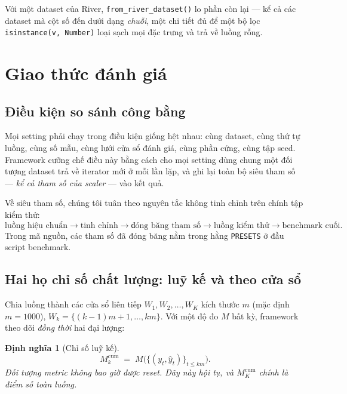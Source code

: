 \documentclass[11pt,a4paper]{article}
\newtheorem{definition}{Định nghĩa}
\theoremstyle{remark}
\begin{document}
\noindent
Với một dataset của River, \texttt{from\_river\_dataset()} lo phần còn lại --- kể
cả các dataset mà cột số đến dưới dạng \emph{chuỗi}, một chi tiết đủ để một bộ
lọc \texttt{isinstance(v, Number)} loại sạch mọi đặc trưng và trả về luồng rỗng.

\section{Giao thức đánh giá}
\label{sec:protocol}

\subsection{Điều kiện so sánh công bằng}

Mọi setting phải chạy trong điều kiện giống hệt nhau: cùng dataset, cùng thứ tự
luồng, cùng số mẫu, cùng lưới cửa sổ đánh giá, cùng phần cứng, cùng tập seed.
Framework cưỡng chế điều này bằng cách cho mọi setting dùng chung một đối tượng
dataset trả về iterator mới ở mỗi lần lặp, và ghi lại toàn bộ siêu tham số ---
\emph{kể cả tham số của scaler} --- vào kết quả.

Về siêu tham số, chúng tôi tuân theo nguyên tắc không tinh chỉnh trên chính tập
kiểm thử:
\[
\text{luồng hiệu chuẩn} \longrightarrow \text{tinh chỉnh} \longrightarrow
\text{đóng băng tham số} \longrightarrow \text{luồng kiểm thử} \longrightarrow
\text{benchmark cuối}.
\]
Trong mã nguồn, các tham số đã đóng băng nằm trong hằng \texttt{PRESETS} ở đầu
script benchmark.

\subsection{Hai họ chỉ số chất lượng: luỹ kế và theo cửa sổ}
\label{sec:cumwin}

Chia luồng thành các cửa sổ liên tiếp $W_1, W_2, \dots, W_K$ kích thước $m$
(mặc định $m=1000$), $W_k = \{(k-1)m+1,\dots,km\}$. Với một độ đo $M$ bất kỳ,
framework theo dõi \emph{đồng thời} hai đại lượng:

\begin{definition}[Chỉ số luỹ kế]
\begin{equation}
  M^{\mathrm{cum}}_k \;=\; M\Big(\{(y_t,\hat y_t)\}_{t \le km}\Big).
\end{equation}
Đối tượng metric không bao giờ được reset. Dãy này hội tụ, và
$M^{\mathrm{cum}}_K$ chính là điểm số toàn luồng.
\end{definition}
\end{document}
